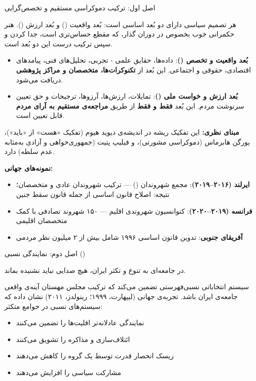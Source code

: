\begin{principlebox}{اصل اول: ترکیب دموکراسی مستقیم و تخصص‌گرایی}
	\begin{quotebox}
		هر تصمیم سیاسی دارای دو بُعد اساسی است: بُعد واقعیت () و بُعد ارزش ().
		هنر حکمرانی خوب بخصوص در دوران گذار، که مقطع حساس‌تری است، جدا کردن و سپس ترکیب درست این دو بُعد است.
	\end{quotebox}
	
	\vspace{0.5em}
	\begin{itemize}
		\item \textbf{بُعد واقعیت و تخصص ()}: داده‌ها، حقایق علمی‌ - تجربی،
		تحلیل‌های فنی، پیامدهای اقتصادی، حقوقی و اجتماعی. این بُعد از \textbf{تکنوکرات‌ها،
			متخصصان و مراکز پژوهشی} دریافت می‌شود.
		
		\item \textbf{بُعد ارزش و خواست ملی ()}: تمایلات، ارزش‌ها،
		آرزوها، ترجیحات و حق تعیین سرنوشت مردم. این بُعد \textbf{فقط و فقط} از طریق
		\textbf{مراجعه‌ی مستقیم به آرای مردم} قابل تعیین است.
	\end{itemize}
	
	\vspace{0.5em}
	\textbf{مبنای نظری:} این تفکیک ریشه در اندیشه‌ی دیوید هیوم (تفکیک «هست» از «باید»)،
	یورگن هابرماس (دموکراسی مشورتی)، و فیلیپ پتیت (جمهوری‌خواهی و آزادی به‌مثابه
	عدم سلطه) دارد.
	
	\textbf{نمونه‌های جهانی:}
	\begin{itemize}
		\item \textbf{ایرلند (۲۰۱۶--۲۰۱۹)}: مجمع شهروندان () --- ترکیب شهروندان عادی و متخصصان؛ نتیجه: اصلاح قانون اساسی از جمله قانون سقط جنین
		\item \textbf{فرانسه (۲۰۱۹--۲۰۲۰)}: کنوانسیون شهروندی اقلیم --- ۱۵۰ شهروند تصادفی با کمک متخصصان اقلیمی
		\item \textbf{آفریقای جنوبی}: تدوین قانون اساسی ۱۹۹۶ شامل بیش از ۲ میلیون نظر مردمی
	\end{itemize}
\end{principlebox}

\begin{principlebox}{اصل دوم: نمایندگی نسبی ()}
	\begin{quotebox}
		در جامعه‌ای به تنوع و تکثر ایران، هیچ صدایی نباید نشنیده بماند.
	\end{quotebox}
	
	سیستم انتخاباتی نسبی‌فهرستی تضمین می‌کند که ترکیب مجلس مهستان آینه‌ی واقعی جامعه‌ی
	ایران باشد. تجربه‌ی جهانی (لیپهارت، ۱۹۹۹؛ رینولدز، ۲۰۱۱) نشان داده که سیستم‌های
	نسبی در جوامع متکثر:
	\begin{itemize}
		\item نمایندگی عادلانه‌تر اقلیت‌ها را تضمین می‌کنند
		\item ائتلاف‌سازی و مذاکره را تشویق می‌کنند
		\item ریسک انحصار قدرت توسط یک گروه را کاهش می‌دهند
		\item مشارکت سیاسی را افزایش می‌دهند
	\end{itemize}
\end{principlebox}

